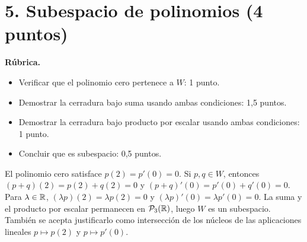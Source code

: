 \documentclass[10pt,a4]{examenEPN0}
\begin{document}
\section*{5. Subespacio de polinomios (4 puntos)}
\noindent\textbf{Rúbrica.}
\begin{itemize}[itemsep=2pt]
    \item Verificar que el polinomio cero pertenece a $W$: 1 punto.
    \item Demostrar la cerradura bajo suma usando ambas condiciones: 1,5 puntos.
    \item Demostrar la cerradura bajo producto por escalar usando ambas condiciones: 1 punto.
    \item Concluir que es subespacio: 0,5 puntos.
\end{itemize}
El polinomio cero satisface $p(2)=p'(0)=0$. Si $p,q\in W$, entonces
$(p+q)(2)=p(2)+q(2)=0$ y $(p+q)'(0)=p'(0)+q'(0)=0$.
Para $\lambda\in\mathbb{R}$, $(\lambda p)(2)=\lambda p(2)=0$ y
$(\lambda p)'(0)=\lambda p'(0)=0$. La suma y el producto por escalar
permanecen en $\mathcal P_3(\mathbb{R})$, luego $W$ es un subespacio.
También se acepta justificarlo como intersección de los núcleos de las
aplicaciones lineales $p\mapsto p(2)$ y $p\mapsto p'(0)$.
\end{document}
